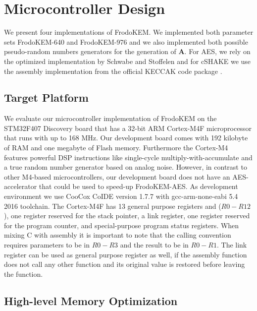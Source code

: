 \section{Microcontroller Design}

We present four implementations of \textsf{FrodoKEM}. We implemented both parameter sets \textsf{FrodoKEM-640} and \textsf{FrodoKEM-976}
and we also implemented both possible pseudo-random numbers generators for the generation of $\mathbf{A}$. For AES, we rely on the optimized implementation by Schwabe and Stoffelen \cite{DBLP:conf/sacrypt/SchwabeS16} and for cSHAKE we use the assembly implementation from the official KECCAK code package \cite{bertoni2016keccak}.

\subsection{Target Platform}

We evaluate our microcontroller implementation of \textsf{FrodoKEM} on the STM32F407 Discovery board that has a 32-bit ARM Cortex-M4F microprocessor that runs with up to 168 MHz. Our development board comes with 192 kilobyte of RAM and one megabyte of Flash memory. Furthermore the Cortex-M4 features powerful DSP instructions like single-cycle multiply-with-accumulate and a true random number generator based on analog noise. However, in contrast to other M4-based microcontrollers, our development board does not have an AES-accelerator that could be used to speed-up \textsf{FrodoKEM-AES}. As development environment we use CooCox CoIDE version 1.7.7 with gcc-arm-none-eabi 5.4 2016 toolchain. The Cortex-M4F has 13 general purpose registers and ($R0-R12$), one register reserved for the stack pointer, a link register, one register reserved for the program counter, and special-purpose program status registers. When mixing C with assembly it is important to note that the calling convention requires parameters to be in $R0-R3$ and the result to be in $R0-R1$. The link register can be used as general purpose register as well, if the assembly function does not call any other function and its original value is restored before leaving the function.

\subsection{High-level Memory Optimization}

